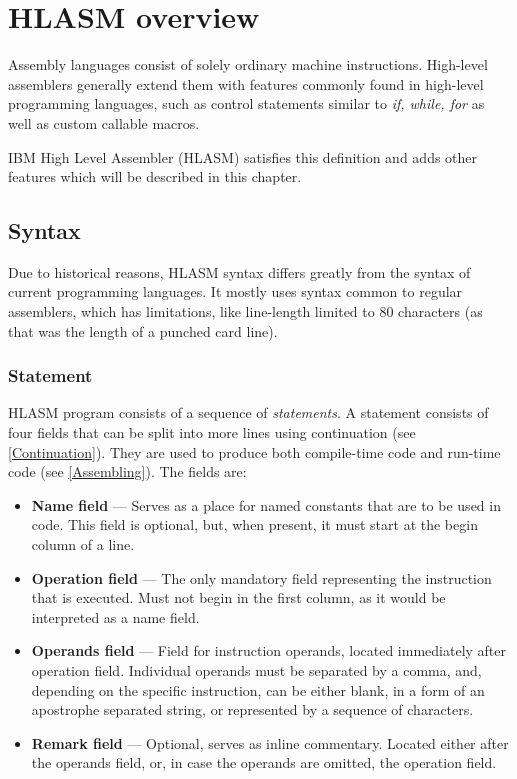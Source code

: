 \chapter{HLASM overview}

Assembly languages consist of solely ordinary machine instructions. High-level assemblers generally extend them with features commonly found in high-level programming languages, such as control statements similar to \emph{if, while, for} as well as custom callable macros.

IBM High Level Assembler (HLASM) satisfies this definition and adds other features which will be described in this chapter.

\section{Syntax}

Due to historical reasons, HLASM syntax differs greatly from the syntax of current programming languages. It mostly uses syntax common to regular assemblers, which has limitations, like line-length limited to 80 characters (as that was the length of a punched card line).

\subsection{Statement}

HLASM program consists of a sequence of \emph{statements}. A statement consists of four fields that can be split into more lines using continuation (see \cref{Continuation}). They are used to produce both compile-time code and run-time code (see \cref{Assembling}). The fields are:
\begin{itemize}
	\item \textbf{Name field} --- Serves as a place for named constants that are to be used in code. This field is optional, but, when present, it must start at the begin column of a line.
	
	\item \textbf{Operation field} --- The only mandatory field representing the instruction that is executed. Must not begin in the first column, as it would be interpreted as a name field.
	
	\item \textbf{Operands field} --- Field for instruction operands, located immediately after operation field. Individual operands must be separated by a comma, and, depending on the specific instruction, can be either blank, in a form of an apostrophe separated string, or represented by a sequence of characters.
	
	\item \textbf{Remark field} --- Optional, serves as inline commentary. Located either after the operands field, or, in case the operands are omitted, the operation field. 
\end{itemize}


